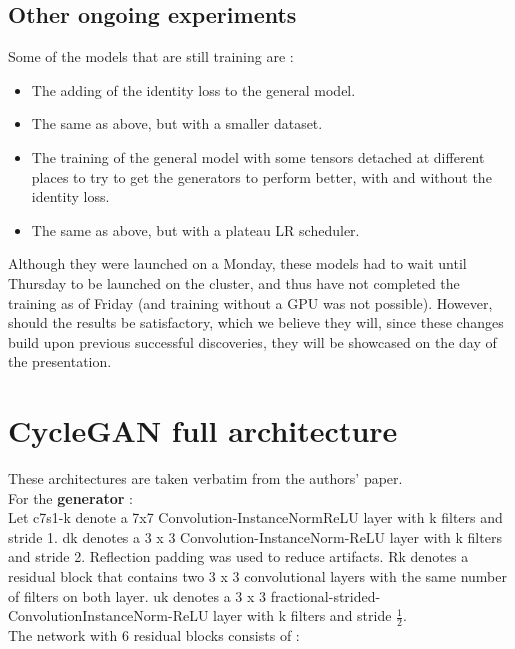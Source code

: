 \documentclass[twocolumn,superscriptaddress,aps,floatfix, nofootinbib]{revtex4-1}
\begin{document}
    \subsection{Other ongoing experiments}
    
    Some of the models that are still training are :
    \begin{itemize}
        \item The adding of the identity loss to the general model.
        \item The same as above, but with a smaller dataset.
        \item The training of the general model with some tensors detached at different places to try to get the generators to perform better, with and without the identity loss.
        \item The same as above, but with a plateau LR scheduler.
    \end{itemize}
    
    Although they were launched on a Monday, these models had to wait until Thursday to be launched on the cluster, and thus have not completed the training as of Friday (and training without a GPU was not possible). However, should the results be satisfactory, which we believe they will, since these changes build upon previous successful discoveries, they will be showcased on the day of the presentation.
    
    \section{CycleGAN full architecture}
    
    These architectures are taken verbatim from the authors' paper.\\
    
    For the \textbf{generator} : \\
    
    Let c7s1-k denote a 7x7 Convolution-InstanceNormReLU layer with k filters and stride 1. dk denotes a 3 x 3 Convolution-InstanceNorm-ReLU layer with k filters and stride 2. Reflection padding was used to reduce artifacts. Rk denotes a residual block that contains two 3 x 3 convolutional layers with the same number of filters on both layer. uk denotes a 3 x 3 fractional-strided-ConvolutionInstanceNorm-ReLU layer with k filters and stride $\frac{1}{2}$.\\
    
    The network with 6 residual blocks consists of :\\
    
\end{document}
